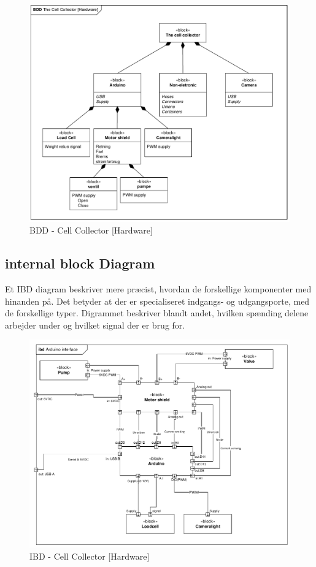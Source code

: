 \begin{figure}[H]
	\centering
	\includegraphics[width=1\textwidth]{pdf/BDD_Hardware_4315_cropped.pdf}
	\caption{BDD - Cell Collector [Hardware]}
	\label{fig:bdd_Hardware}
\end{figure}

\subsection{internal block Diagram} 
Et IBD diagram beskriver mere præcist, hvordan de forskellige komponenter med hinanden på. Det betyder at der er specialiseret indgangs- og udgangsporte, med de forskellige typer. Digrammet beskriver blandt andet, hvilken spænding delene arbejder under og hvilket signal der er brug for.
\begin{figure}[H]
	\centering
	\includegraphics[width=1\textwidth]{pdf/IBD_Hardware(Arduino)_cropped.pdf}
	\caption{IBD - Cell Collector [Hardware]}
	\label{fig:ibd_Hardware}
\end{figure}



